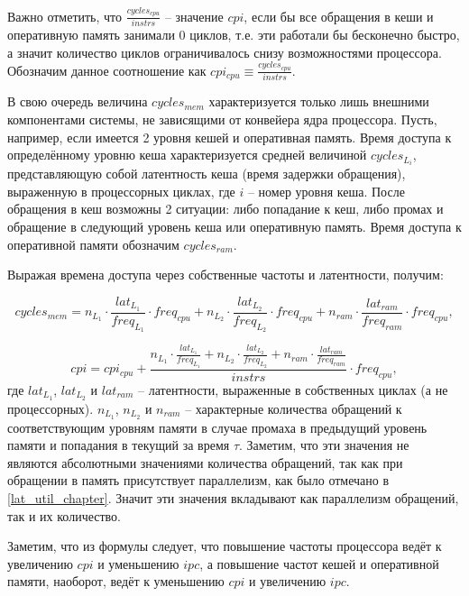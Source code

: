     Важно отметить, что $\frac{cycles_{cpu}}{instrs}$ -- значение $cpi$, если бы все обращения
    в кеши и оперативную память занимали 0 циклов, т.е. эти работали бы бесконечно быстро, а значит
    количество циклов ограничивалось снизу возможностями процессора. Обозначим данное соотношение
    как $cpi_{cpu} \equiv \frac{cycles_{cpu}}{instrs}$.

    В свою очередь величина $cycles_{mem}$ характеризуется только лишь внешними компонентами системы,
    не зависящими от конвейера ядра процессора. Пусть, например, если имеется 2 уровня кешей и оперативная память.
    Время доступа к определённому уровню кеша характеризуется средней величиной $cycles_{L_{i}}$,
    представляющую собой латентность кеша (время задержки обращения), выраженную в процессорных
    циклах, где $i$ -- номер уровня кеша.
    После обращения в кеш возможны 2 ситуации: либо попадание к кеш, либо промах и обращение в
    следующий уровень кеша или оперативную память.
    Время доступа к оперативной памяти обозначим $cycles_{ram}$.

    Выражая времена доступа через собственные частоты и латентности, получим:

    \begin{equation}
        cycles_{mem} = n_{L_1} \cdot \frac{lat_{L_1}}{freq_{L_1}} \cdot freq_{cpu} +
        n_{L_2} \cdot \frac{lat_{L_2}}{freq_{L_2}} \cdot freq_{cpu} +
        n_{ram} \cdot \frac{lat_{ram}}{freq_{ram}} \cdot freq_{cpu},
    \end{equation}

    \begin{equation}
        cpi = cpi_{cpu} + \frac{n_{L_1} \cdot \frac{lat_{L_1}}{freq_{L_1}} +
        n_{L_2} \cdot \frac{lat_{L_2}}{freq_{L_2}} +
        n_{ram} \cdot \frac{lat_{ram}}{freq_{ram}}}{instrs} \cdot freq_{cpu},
    \end{equation}
    где $lat_{L_1}$, $lat_{L_2}$ и $lat_{ram}$ -- латентности, выраженные в собственных циклах
    (а не процессорных). $n_{L_1}$, $n_{L_2}$ и $n_{ram}$ -- характерные количества обращений к
    соответствующим уровням памяти в случае промаха в предыдущий уровень памяти и попадания
    в текущий за время $\tau$. Заметим, что эти значения не являются абсолютными значениями
    количества обращений, так как при обращении в память присутствует параллелизм, как было отмечано
    в \ref{lat_util_chapter}. Значит эти значения вкладывают как параллелизм обращений, так и их
    количество.

    Заметим, что из формулы следует, что повышение частоты процессора ведёт к увеличению $cpi$
    и уменьшению $ipc$, а повышение частот кешей и оперативной памяти, наоборот, ведёт к
    уменьшению $cpi$ и увеличению $ipc$.

